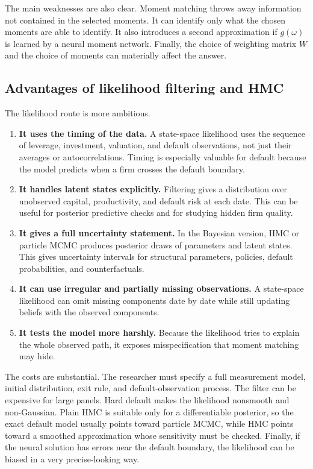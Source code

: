\documentclass[11pt]{article}
\newcommand{\1}{\mathbf{1}}
\begin{document}
The main weaknesses are also clear. Moment matching throws away information not
contained in the selected moments. It can identify only what the chosen moments
are able to identify. It also introduces a second approximation if \(g(\omega)\)
is learned by a neural moment network. Finally, the choice of weighting matrix
\(W\) and the choice of moments can materially affect the answer.

\subsection{Advantages of likelihood filtering and HMC}

The likelihood route is more ambitious.

\begin{enumerate}[leftmargin=2em]
  \item \textbf{It uses the timing of the data.} A state-space likelihood uses
  the sequence of leverage, investment, valuation, and default observations,
  not just their averages or autocorrelations. Timing is especially valuable
  for default because the model predicts when a firm crosses the default
  boundary.

  \item \textbf{It handles latent states explicitly.} Filtering gives a
  distribution over unobserved capital, productivity, and default risk at each
  date. This can be useful for posterior predictive checks and for studying
  hidden firm quality.

  \item \textbf{It gives a full uncertainty statement.} In the Bayesian version,
  HMC or particle MCMC produces posterior draws of parameters and latent states.
  This gives uncertainty intervals for structural parameters, policies, default
  probabilities, and counterfactuals.

  \item \textbf{It can use irregular and partially missing observations.} A
  state-space likelihood can omit missing components date by date while still
  updating beliefs with the observed components.

  \item \textbf{It tests the model more harshly.} Because the likelihood tries
  to explain the whole observed path, it exposes misspecification that moment
  matching may hide.
\end{enumerate}

The costs are substantial. The researcher must specify a full measurement
model, initial distribution, exit rule, and default-observation process. The
filter can be expensive for large panels. Hard default makes the likelihood
nonsmooth and non-Gaussian. Plain HMC is suitable only for a differentiable
posterior, so the exact default model usually points toward particle MCMC,
while HMC points toward a smoothed approximation whose sensitivity must be
checked. Finally, if the neural solution has errors near the default boundary,
the likelihood can be biased in a very precise-looking way.
\end{document}
